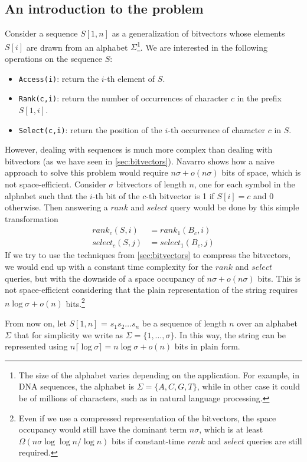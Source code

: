 \subsection*{An introduction to the problem}
Consider a sequence $S[1,n]$ as a generalization of bitvectors whose elements $S[i]$ are drawn from an alphabet $\Sigma$\footnote{The size of the alphabet varies depending on the application. For example, in DNA sequences, the alphabet is $\Sigma = \{A,C,G,T\}$, while in other case it could be of millions of characters, such as in natural language processing.}. We are interested in the following operations on the sequence $S$:
\begin{itemize}
    \item \texttt{Access(i)}: return the $i$-th element of $S$.
    \item \texttt{Rank(c,i)}: return the number of occurrences of character $c$ in the prefix $S[1,i]$.
    \item \texttt{Select(c,i)}: return the position of the $i$-th occurrence of character $c$ in $S$.
\end{itemize}
However, dealing with sequences is much more complex than dealing with bitvectors (as we have seen in \autoref{sec:bitvectors}). Navarro \cite{navarro2016compact} shows how a naive approach to solve this problem would require $n\sigma + o(n\sigma)$ bits of space, which is not space-efficient. Consider $\sigma$ bitvectors of length $n$, one for each symbol in the alphabet such that the $i$-th bit of the $c$-th bitvector is 1 if $S[i] = c$ and 0 otherwise. Then answering a $rank$ and $select$ query would be done by this simple transformation
\begin{align*}
    rank_c(S,i)   & = rank_1(B_c,i)   \\
    select_c(S,j) & = select_1(B_c,j)
\end{align*}
If we try to use the techniques from \autoref{sec:bitvectors} to compress the bitvectors, we would end up with a constant time complexity for the $rank$ and $select$ queries, but with the downside of a space occupancy of $n\sigma + o(n\sigma)$ bits. This is not space-efficient considering that the plain representation of the string requires $n\log \sigma + o(n)$ bits.\footnote{Even if we use a compressed representation of the bitvectors, the space occupancy would still have the dominant term $n\sigma$, which is at least $\Omega(n\sigma \log \log n / \log n)$ bits if constant-time $rank$ and $select$ queries are still required.}
\begin{remark}[Notation]
    From now on, let $S[1,n]$ = $s_1s_2\dots s_n$ be a sequence of length $n$ over an alphabet $\Sigma$ that for simplicity we write as $\Sigma = \{1,\dots,\sigma\}$. In this way, the string can be represented using $n \lceil \log \sigma \rceil = n \log \sigma + o(n)$ bits in plain form.
\end{remark}

